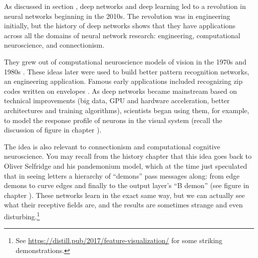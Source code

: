 As discussed in section , deep networks and deep learning led to a revolution in neural networks beginning in the 2010s. The revolution was in engineering initially, but the history of deep networks shows that they have applications across all the domains of neural network research: engineering, computational neuroscience, and connectionism. 

They grew out of computational neuroscience models of vision in the 1970s and 1980s \cite{fukushima1982neocognitron}.  These ideas later were used to build better pattern recognition networks, an engineering application. Famous early applications included recognizing zip codes written on envelopes \cite{lecun1989backpropagation}. As deep networks became mainstream based on technical improvements (big data, GPU and hardware acceleration, better architectures and training algorithms), scientists began using them, for example, to model the response profile of neurons in the visual system (recall the discussion of figure  in chapter ). 

The idea is also relevant to connectionism and computational cognitive neuroscience. You may recall from the history chapter that this idea goes  back to Oliver Selfridge and his pandemonium model, which at the time just speculated that in seeing letters a hierarchy of ``demons'' pass messages along: from edge demons to curve edges and finally to the output layer's ``B demon'' (see figure  in chapter ). These networks learn in the exact same way, but we can actually  see what their receptive fields are, and the results are sometimes strange and even disturbing.\footnote{See \url{https://distill.pub/2017/feature-visualization/} for some striking demonstrations.} 
